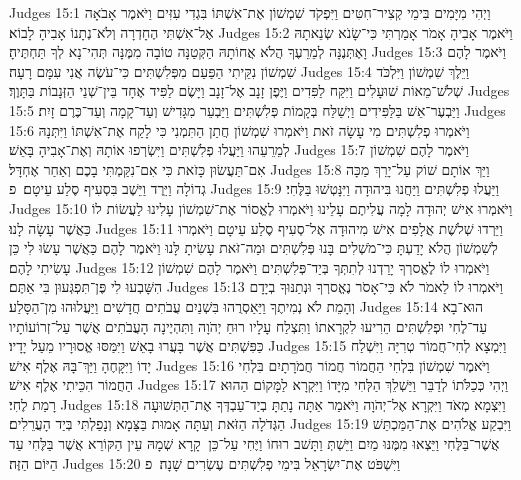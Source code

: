 Judges 15:1	וַיְהִי מִיָּמִים בִּימֵי קְצִיר־חִטִּים וַיִּפְקֹד שִׁמְשׁוֹן אֶת־אִשְׁתּוֹ בִּגְדִי עִזִּים וַיֹּאמֶר אָבֹאָה אֶל־אִשְׁתִּי הֶחָדְרָה וְלֹא־נְתָנוֹ אָבִיהָ לָבוֹא׃
Judges 15:2	וַיֹּאמֶר אָבִיהָ אָמֹר אָמַרְתִּי כִּי־שָׂנֹא שְׂנֵאתָהּ וָאֶתְּנֶנָּה לְמֵרֵעֶךָ הֲלֹא אֲחוֹתָהּ הַקְּטַנָּה טוֹבָה מִמֶּנָּה תְּהִי־נָא לְךָ תַּחְתֶּיהָ׃
Judges 15:3	וַיֹּאמֶר לָהֶם שִׁמְשׁוֹן נִקֵּיתִי הַפַּעַם מִפְּלִשְׁתִּים כִּי־עֹשֶׂה אֲנִי עִמָּם רָעָה׃
Judges 15:4	וַיֵּלֶךְ שִׁמְשׁוֹן וַיִּלְכֹּד שְׁלֹשׁ־מֵאוֹת שׁוּעָלִים וַיִּקַּח לַפִּדִים וַיֶּפֶן זָנָב אֶל־זָנָב וַיָּשֶׂם לַפִּיד אֶחָד בֵּין־שְׁנֵי הַזְּנָבוֹת בַּתָּוֶךְ׃
Judges 15:5	וַיַּבְעֶר־אֵשׁ בַּלַּפִּידִים וַיְשַׁלַּח בְּקָמוֹת פְּלִשְׁתִּים וַיַּבְעֵר מִגָּדִישׁ וְעַד־קָמָה וְעַד־כֶּרֶם זָיִת׃
Judges 15:6	וַיֹּאמְרוּ פְלִשְׁתִּים מִי עָשָׂה זֹאת וַיֹּאמְרוּ שִׁמְשׁוֹן חֲתַן הַתִּמְנִי כִּי לָקַח אֶת־אִשְׁתּוֹ וַיִּתְּנָהּ לְמֵרֵעֵהוּ וַיַּעֲלוּ פְלִשְׁתִּים וַיִּשְׂרְפוּ אוֹתָהּ וְאֶת־אָבִיהָ בָּאֵשׁ׃
Judges 15:7	וַיֹּאמֶר לָהֶם שִׁמְשׁוֹן אִם־תַּעֲשׂוּן כָּזֹאת כִּי אִם־נִקַּמְתִּי בָכֶם וְאַחַר אֶחְדָּל׃
Judges 15:8	וַיַּךְ אוֹתָם שׁוֹק עַל־יָרֵךְ מַכָּה גְדוֹלָה וַיֵּרֶד וַיֵּשֶׁב בִּסְעִיף סֶלַע עֵיטָם׃ {פ}
Judges 15:9	וַיַּעֲלוּ פְלִשְׁתִּים וַיַּחֲנוּ בִּיהוּדָה וַיִּנָּטְשׁוּ בַּלֶּחִי׃
Judges 15:10	וַיֹּאמְרוּ אִישׁ יְהוּדָה לָמָה עֲלִיתֶם עָלֵינוּ וַיֹּאמְרוּ לֶאֱסוֹר אֶת־שִׁמְשׁוֹן עָלִינוּ לַעֲשׂוֹת לוֹ כַּאֲשֶׁר עָשָׂה לָנוּ׃
Judges 15:11	וַיֵּרְדוּ שְׁלֹשֶׁת אֲלָפִים אִישׁ מִיהוּדָה אֶל־סְעִיף סֶלַע עֵיטָם וַיֹּאמְרוּ לְשִׁמְשׁוֹן הֲלֹא יָדַעְתָּ כִּי־מֹשְׁלִים בָּנוּ פְּלִשְׁתִּים וּמַה־זֹּאת עָשִׂיתָ לָּנוּ וַיֹּאמֶר לָהֶם כַּאֲשֶׁר עָשׂוּ לִי כֵּן עָשִׂיתִי לָהֶם׃
Judges 15:12	וַיֹּאמְרוּ לוֹ לֶאֱסרְךָ יָרַדְנוּ לְתִתְּךָ בְּיַד־פְּלִשְׁתִּים וַיֹּאמֶר לָהֶם שִׁמְשׁוֹן הִשָּׁבְעוּ לִי פֶּן־תִּפְגְּעוּן בִּי אַתֶּם׃
Judges 15:13	וַיֹּאמְרוּ לוֹ לֵאמֹר לֹא כִּי־אָסֹר נֶאֱסרְךָ וּנְתַנּוּךָ בְיָדָם וְהָמֵת לֹא נְמִיתֶךָ וַיַּאַסְרֻהוּ בִּשְׁנַיִם עֲבֹתִים חֲדָשִׁים וַיַּעֲלוּהוּ מִן־הַסָּלַע׃
Judges 15:14	הוּא־בָא עַד־לֶחִי וּפְלִשְׁתִּים הֵרִיעוּ לִקְרָאתוֹ וַתִּצְלַח עָלָיו רוּחַ יְהֹוָה וַתִּהְיֶינָה הָעֲבֹתִים אֲשֶׁר עַל־זְרוֹעוֹתָיו כַּפִּשְׁתִּים אֲשֶׁר בָּעֲרוּ בָאֵשׁ וַיִּמַּסּוּ אֱסוּרָיו מֵעַל יָדָיו׃
Judges 15:15	וַיִּמְצָא לְחִי־חֲמוֹר טְרִיָּה וַיִּשְׁלַח יָדוֹ וַיִּקָּחֶהָ וַיַּךְ־בָּהּ אֶלֶף אִישׁ׃
Judges 15:16	וַיֹּאמֶר שִׁמְשׁוֹן בִּלְחִי הַחֲמוֹר חֲמוֹר חֲמֹרָתָיִם בִּלְחִי הַחֲמוֹר הִכֵּיתִי אֶלֶף אִישׁ׃
Judges 15:17	וַיְהִי כְּכַלֹּתוֹ לְדַבֵּר וַיַּשְׁלֵךְ הַלְּחִי מִיָּדוֹ וַיִּקְרָא לַמָּקוֹם הַהוּא רָמַת לֶחִי׃
Judges 15:18	וַיִּצְמָא מְאֹד וַיִּקְרָא אֶל־יְהֹוָה וַיֹּאמַר אַתָּה נָתַתָּ בְיַד־עַבְדְּךָ אֶת־הַתְּשׁוּעָה הַגְּדֹלָה הַזֹּאת וְעַתָּה אָמוּת בַּצָּמָא וְנָפַלְתִּי בְּיַד הָעֲרֵלִים׃
Judges 15:19	וַיִּבְקַע אֱלֹהִים אֶת־הַמַּכְתֵּשׁ אֲשֶׁר־בַּלֶּחִי וַיֵּצְאוּ מִמֶּנּוּ מַיִם וַיֵּשְׁתְּ וַתָּשׁב רוּחוֹ וַיֶּחִי עַל־כֵּן  קָרָא שְׁמָהּ עֵין הַקּוֹרֵא אֲשֶׁר בַּלֶּחִי עַד הַיּוֹם הַזֶּה׃
Judges 15:20	וַיִּשְׁפֹּט אֶת־יִשְׂרָאֵל בִּימֵי פְלִשְׁתִּים עֶשְׂרִים שָׁנָה׃ {פ}

